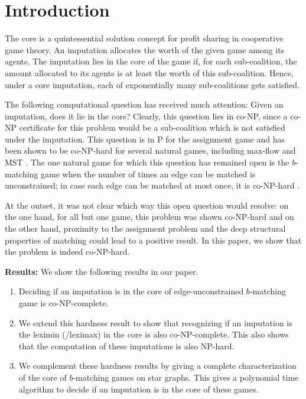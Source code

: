 
\section{Introduction}


The core is a quintessential solution concept for profit sharing in cooperative game theory. An imputation allocates the worth of the given game among its agents. The imputation lies in the core of the game if, for each sub-coalition, the amount allocated to its agents is at least the worth of this sub-coalition. Hence, under a core imputation, each of exponentially many sub-coalitions gets satisfied. 

The following computational question has received much attention: Given an imputation, does it lie in the core? Clearly, this question lies in co-NP, since a co-NP certificate for this problem would be a sub-coalition which is not satisfied under the imputation. This question is in P for the assignment game \cite{Shapley1971assignment} and has been shown to be co-NP-hard for several natural games, including max-flow \cite{Fang2002computational} and MST \cite{Faigle1997complexity}. The one natural game for which this question has remained open is the $b$-matching game when the number of times an edge can be matched is unconstrained; in case each edge can be matched at most once, it is co-NP-hard \cite{biro2018stable}.

At the outset, it was not clear which way this open question would resolve: on the one hand, for all but one game, this problem was shown co-NP-hard and on the other hand, proximity to the assignment problem and the deep structural properties of matching could lead to a positive result. In this paper, we show that the problem is indeed co-NP-hard. 

\textbf{Results:}
We show the following results in our paper.
\begin{enumerate}
    \item Deciding if an imputation is in the core of edge-unconstrained $b$-matching game is co-NP-complete.
    \item We extend this hardness result to show that recognizing if an imputation is the leximin 
   (/leximax) in the core is also co-NP-complete. This also shows that the computation of these imputations is also NP-hard.
    \item We complement these hardness results by giving a complete characterization of the core of $b$-matching games on star graphs. This gives a polynomial time algorithm to decide if an imputation is in the core of these games.

\end{enumerate}





